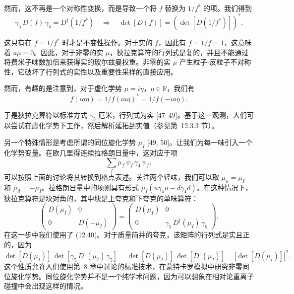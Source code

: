 然而，这不再是一个对称性变换，而是导致一个将 $f$ 替换为 $1/f^*$ 的项。我们得到
\begin{equation}
  \gamma_5\,D(f)\,\gamma_5 = D^\dagger(1/f^*)
  \quad\Rightarrow\quad
  \det[D(f)] = \left(\det[D(1/f^*)]\right)^* .
\end{equation}

这只有在 $f = 1/f^*$ 时才是不变性操作。对于实的 $f$，因此有 $f = 1/f = 1$，这意味着 $a\mu = 0$。因此，对于非零的实 $\mu$，狄拉克算符的行列式是复的，并且不能通过将费米子味数加倍来获得实的玻尔兹曼权重。非零的实 $\mu$ 产生粒子-反粒子不对称性，它破坏了行列式的实性以及重要性采样的直接应用。

然而，有趣的是注意到，对于虚化学势 $\mu = i\eta$，$\eta \in \mathbb{R}$，我们有
\begin{equation}
  f(ia\eta) = 1/f(ia\eta)^* = 1/f(-ia\eta).
\end{equation}

于是狄拉克算符以标准方式 $\gamma_5$-厄米，行列式为实 [47--49]。基于这一观测，人们可以尝试在虚化学势下工作，然后解析延拓到实值（参见第~12.3.3 节）。

另一个特殊情形是考虑所谓的同位旋化学势 $\mu_I$ [49, 50]。让我们为每一味引入一个化学势变量。在欧几里得连续拉格朗日量中，这对应于项
\begin{equation}
  \sum_f \mu_f\,\bar{\psi}_f\,\gamma_4\,\psi_f,
\end{equation}
可以按照上面的讨论将其转换到格点表述。关注两个轻味，我们可以取 $\mu_u = \mu_I$ 和 $\mu_d = -\mu_I$。拉格朗日量中的项则具有形式 $\mu_I(\bar{u}\gamma_4 u - \bar{d}\gamma_4 d)$。在这种情况下，狄拉克算符是块对角的，其中块是上夸克和下夸克的单味算符：
\begin{equation}
  \begin{pmatrix} D(\mu_I) & 0 \\ 0 & D(-\mu_I) \end{pmatrix}
  =
  \begin{pmatrix} D(\mu_I) & 0 \\
                  0 & \gamma_5\,D^\dagger(\mu_I)\,\gamma_5 \end{pmatrix}.
\end{equation}
在这一步中我们使用了 (12.40)。对于质量简并的夸克，该矩阵的行列式是实且正的，因为
\begin{equation}
  \det[D(\mu_I)]\,\det[\gamma_5\,D^\dagger(\mu_I)\,\gamma_5]
  = \det[D(\mu_I)]\,\det[D^\dagger(\mu_I)]
  = \left|\det[D(\mu_I)]\right|^2 .
\end{equation}
这个性质允许人们使用第~8 章中讨论的标准技术，在蒙特卡罗模拟中研究非零同位旋化学势。同位旋化学势并不是一个纯学术问题，因为可以想象在相对论重离子碰撞中会出现这样的情况。

